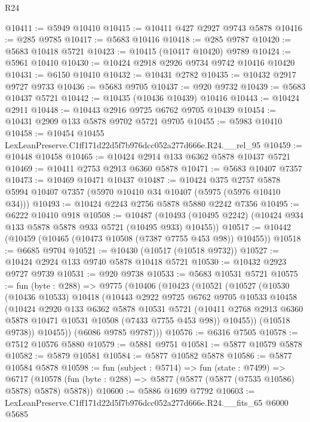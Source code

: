 \begin{lexlean}{R24}
\begin{coremodule}
@10411 := @5949 @10410
@10415 := @10411 @427 @2927 @9743 @5878
@10416 := @285 @9785
@10417 := @5683 @10416
@10418 := @285 @9787
@10420 := @5683 @10418 @5721
@10423 := @10415 (@10417 @10420) @9789
@10424 := @5961 @10410
@10430 := @10424 @2918 @2926 @9734 @9742 @10416 @10420
@10431 := @6150 @10410
@10432 := @10431 @2782
@10435 := @10432 @2917 @9727 @9733
@10436 := @5683 @9705
@10437 := @920 @9732
@10439 := @5683 @10437 @5721
@10442 := @10435 (@10436 @10439) @10416
@10443 := @10424 @2911
@10448 := @10443 @2916 @9725 @6762 @9705 @10439
@10454 := @10431 @2909 @133 @5878 @9702 @5721 @9705
@10455 := @5983 @10410
@10458 := @10454 @10455 LexLeanPreserve.C1ff171d22d5f7b976dcc052a277d666e.R24.__rel_95
@10459 := @10448 @10458
@10465 := @10424 @2914 @133 @6362 @5878 @10437 @5721
@10469 := @10411 @2753 @2913 @6360 @5878
@10471 := @5683 @10407 @7357
@10473 := @10469 @10471 @10437
@10487 := @10424
    @375
    @2757
    @5878
    @5994
    @10407
    @7357
    (@5970 @10410 @34 @10407 (@5975 (@5976 @10410 @34)))
@10493 := @10424 @2243 @2756 @5878 @5880 @2242 @7356
@10495 := @6222 @10410 @918
@10508 := @10487
    (@10493 (@10495 @2242) (@10424 @934 @133 @5878 @5878 @933 @5721 (@10495 @933) @10455))
@10517 := @10442 (@10459 (@10465 (@10473 @10508 (@7387 @7755 @453 @98)) @10455))
@10518 := @6685 @9704
@10521 := @10430 (@10517 (@10518 @9732))
@10527 := @10424 @2924 @133 @9740 @5878 @10418 @5721
@10530 := @10432 @2923 @9727 @9739
@10531 := @920 @9738
@10533 := @5683 @10531 @5721
@10575 := fun (byte : @288) =>
  @9775
    (@10406
      (@10423
        (@10521
          (@10527
            (@10530
              (@10436 @10533)
              @10418
              (@10443
                @2922
                @9725
                @6762
                @9705
                @10533
                @10458
                (@10424
                  @2920
                  @133
                  @6362
                  @5878
                  @10531
                  @5721
                  (@10411 @2768 @2913 @6360 @5878 @10471 @10531 @10508 (@7433 @7755 @453 @98))
                  @10455))
              (@10518 @9738))
            @10455))
        (@6086 @9785 @9787)))
@10576 := @6316 @7505
@10578 := @7512 @10576 @5880
@10579 := @5881 @9751
@10581 := @5877 @10579 @5878
@10582 := @5879 @10581
@10584 := @5877 @10582 @5878
@10586 := @5877 @10584 @5878
@10598 := fun (subject : @5714) =>
  fun (state : @7499) =>
  @6717 (@10578 (fun (byte : @288) => @5877 (@5877 (@5877 (@7535 @10586) @5878) @5878) @5878))
@10600 := @5886 @1699 @7792
@10603 := LexLeanPreserve.C1ff171d22d5f7b976dcc052a277d666e.R24.__fits_65 @6000 @5685

\end{coremodule}
\end{lexlean}

